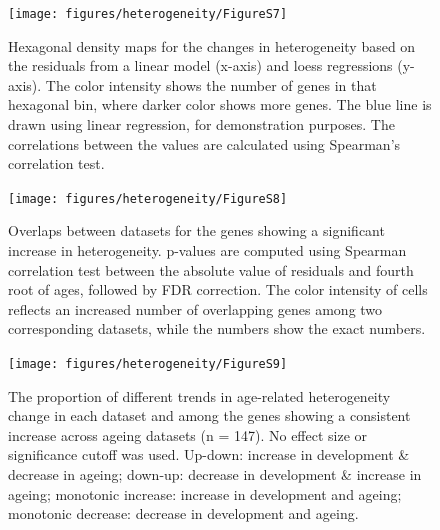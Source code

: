 \documentclass[12pt,twoside]{unicam}
\begin{document}
\begin{figure}

{\centering \texttt{[image: figures/heterogeneity/FigureS7]} 

}

\caption[Correlations between heterogeneity estimates calculated using linear and loess regression.]{Hexagonal density maps for the changes in heterogeneity based on the residuals from a linear model (x-axis) and loess regressions (y-axis). The color intensity shows the number of genes in that hexagonal bin, where darker color shows more genes. The blue line is drawn using linear regression, for demonstration purposes. The correlations between the values are calculated using Spearman's correlation test.}\label{fig:hetFigS7}
\end{figure}

\begin{figure}

{\centering \texttt{[image: figures/heterogeneity/FigureS8]} 

}

\caption[Overlaps between datasets for the genes showing a significant increase in heterogeneity.]{Overlaps between datasets for the genes showing a significant increase in heterogeneity. p-values are computed using Spearman correlation test between the absolute value of residuals and fourth root of ages, followed by FDR correction. The color intensity of cells reflects an increased number of overlapping genes among two corresponding datasets, while the numbers show the exact numbers.}\label{fig:hetFigS8}
\end{figure}

\begin{figure}

{\centering \texttt{[image: figures/heterogeneity/FigureS9]} 

}

\caption[Direction of change in gene expression heterogeneity in development and ageing across datasets.]{The proportion of different trends in age-related heterogeneity change in each dataset and among the genes showing a consistent increase across ageing datasets (n = 147). No effect size or significance cutoff was used. Up-down: increase in development \& decrease in ageing; down-up: decrease in development \& increase in ageing; monotonic increase: increase in development and ageing; monotonic decrease: decrease in development and ageing.}\label{fig:hetFigS9}
\end{figure}
\end{document}
